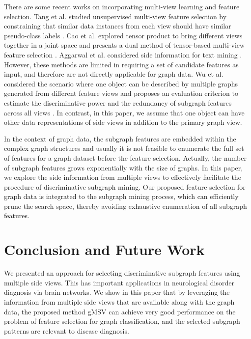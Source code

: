 \documentclass[conference]{IEEEtran}
\newcommand{\galgo}[0]{gMSV}
\begin{document}
There are some recent works on incorporating multi-view learning and feature selection. Tang et al. studied unsupervised multi-view feature selection by constraining that similar data instances from each view should have similar pseudo-class labels \cite{tang2013unsupervised}. Cao et al. explored tensor product to bring different views together in a joint space and presents a dual method of tensor-based multi-view feature selection \cite{cao2014tensor}. Aggarwal et al. considered side information for text mining \cite{aggarwal2012use}. However, these methods are limited in requiring a set of candidate features as input, and therefore are not directly applicable for graph data. Wu et al. considered the scenario where one object can be described by multiple graphs generated from different feature views and proposes an evaluation criterion to estimate the discriminative power and the redundancy of subgraph features across all views \cite{wu2014multi}. In contrast, in this paper, we assume that one object can have other data representations of side views in addition to the primary graph view.

In the context of graph data, the subgraph features are embedded within the complex graph structures and usually it is not feasible to enumerate the full set of features for a graph dataset before the feature selection. Actually, the number of subgraph features grows exponentially with the size of graphs. In this paper, we explore the side information from multiple views to effectively facilitate the procedure of discriminative subgraph mining. Our proposed feature selection for graph data is integrated to the subgraph mining process, which can efficiently prune the search space, thereby avoiding exhaustive enumeration of all subgraph features.


\section{Conclusion and Future Work}\label{sec:conclusion}

We presented an approach for selecting discriminative subgraph features using multiple side views. This has important applications in neurological disorder diagnosis via brain networks. We show in this paper that by leveraging the information from multiple side views that are available along with the graph data, the proposed method {\galgo} can achieve very good performance on the problem of feature selection for graph classification, and the selected subgraph patterns are relevant to disease diagnosis.
\end{document}
